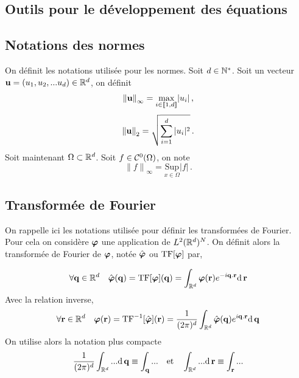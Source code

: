 \documentclass[10.5pt]{article}
\begin{document}
\pagebreak

\appendix


\begin{multicols}{2}
\section{Outils pour le développement des équations}

\label{ann:outils}


\subsection{Notations des normes}

On définit les notations utilisée pour les normes. Soit $d \in \mathbb{N}^*$. Soit un vecteur  ${\bf u} =(u_1, u_2, ... u_d) \in \mathbb{R}^d$, on définit
\begin{equation}
{\| {\bf u}\|}_\infty =  \underset{i \in  \llbracket 1,d \rrbracket }{\text{max}}{|u_i|}\, ,
\end{equation} 
\begin{equation}
{\| {\bf u}\|}_2 =  \sqrt{\sum_{i = 1}^{d} |u_i|^2} \, .
\end{equation}
Soit maintenant $\Omega \subset \mathbb{R}^d$. Soit $f \in \mathcal{C}^0(\Omega)$, on note
\begin{equation}
{\| f \|}_\infty =  \underset{x \in \Omega}{\text{Sup}}{|f|} \, .
\end{equation} 



\subsection{Transformée de Fourier}

On rappelle ici les notations utilisée pour définir les transformées de Fourier. Pour cela on considère $\boldsymbol{ \varphi}$ une application de $L^2(\mathbb{R}^d)^N$. On définit alors la transformée de Fourier de $\boldsymbol{ \varphi}$, notée $\hat{\boldsymbol{ \varphi}}$ ou $\text{TF}[\boldsymbol{ \varphi}]$ par, 

\begin{equation}
  \forall {\bf q} \in \mathbb{R}^d \quad \hat{\boldsymbol{ \varphi}}({\bf q}) = \text{TF}[\boldsymbol{ \varphi}]({\bf q}) = \int_{\mathbb{R}^d} \boldsymbol{ \varphi}({\bf r}) e^{-i{\bf q}.{\bf r}}\text{d} \,{\bf r}
\end{equation}
Avec la relation inverse,
\begin{equation}
  \forall {\bf r} \in \mathbb{R}^d \quad \boldsymbol{ \varphi}({\bf r})  = \text{TF}^{-1}[\hat{\boldsymbol{ \varphi}}]({\bf r}) = \frac{1}{(2\pi)^d}\int_{\mathbb{R}^d} \hat{\boldsymbol{ \varphi}}({\bf q}) e^{i{\bf q}.{\bf r}}\text{d} \,{\bf q}
\end{equation}
On utilise alors la notation plus compacte 
\begin{equation}
  \frac{1}{(2\pi)^d}\int_{\mathbb{R}^d} ... \text{d} \,{\bf q} \equiv \int_{\bf q} ... \quad \text{et} \quad  \int_{\mathbb{R}^d} ... \text{d} \,{\bf r} \equiv \int_{\bf r} ... 
\end{equation}


\end{multicols}
\end{document}
